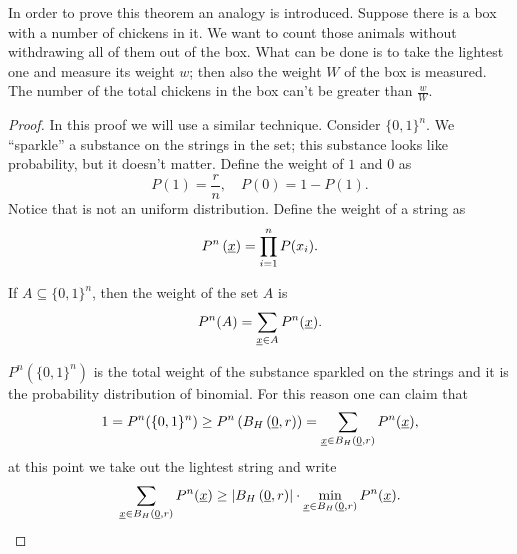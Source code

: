 In order to prove this theorem an analogy is introduced.
Suppose there is a box with a number of chickens in it.
We want to count those animals without withdrawing all of them out of the box. What can be done is to take the lightest one and measure its weight $w$; then also the weight $W$ of the box is measured.
The number of the total chickens in the box can't be greater than $\frac{w}{W}$.

\begin{proof}
	In this proof we will use a similar technique.
	Consider $\{0, 1\}^n$.
	We ``sparkle'' a substance on the strings in the set; this substance looks like probability, but it doesn't matter.
	Define the weight of $1$ and $0$ as 
	\begin{equation*}
		P(1) = \frac{r}{n}, \quad P(0) = 1 - P(1).
	\end{equation*}
	Notice that is not an uniform distribution.
	Define the weight of a string as
	\begin{equation*}
		P^n\left(\underline{x}\right) = \prod_{i = 1}^n P(x_i).
	\end{equation*}

	If $A \subseteq \{0, 1\}^n$, then the weight of the set $A$ is
	\begin{equation*}
		P^n(A) = \sum_{\underline{x} \in A} P^n(\underline{x}).
	\end{equation*}

	$P^n(\{0, 1\}^n)$ is the total weight of the substance sparkled on the strings and it is the probability distribution of binomial.
	For this reason one can claim that
	\begin{equation*}
		1
		=
		P^n (\{0, 1\}^n)
		\ge
		P^n \left(B_H\left(\underline{0}, r\right)\right)
		=
		\sum_{\underline{x} \in B_H\left(\underline{0}, r\right)} P^n(\underline{x}),
	\end{equation*}
	at this point we take out the lightest string and write
	\begin{equation*}
		\sum_{\underline{x} \in B_H\left(\underline{0}, r\right)} P^n(\underline{x})
		\ge
		\left|{B_H\left(\underline{0}, r\right)}\right| \cdot \min_{\underline{x} \in B_H\left(\underline{0}, r\right)} P^n(\underline{x}).
	\end{equation*}


\end{proof}
